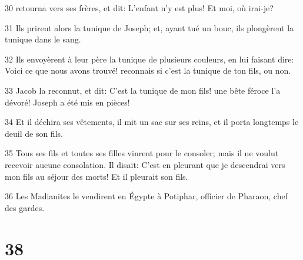 \par 30 retourna vers ses frères, et dit: L'enfant n'y est plus! Et moi, où irai-je?
\par 31 Ils prirent alors la tunique de Joseph; et, ayant tué un bouc, ils plongèrent la tunique dans le sang.
\par 32 Ils envoyèrent à leur père la tunique de plusieurs couleurs, en lui faisant dire: Voici ce que nous avons trouvé! reconnais si c'est la tunique de ton fils, ou non.
\par 33 Jacob la reconnut, et dit: C'est la tunique de mon fils! une bête féroce l'a dévoré! Joseph a été mis en pièces!
\par 34 Et il déchira ses vêtements, il mit un sac sur ses reins, et il porta longtemps le deuil de son fils.
\par 35 Tous ses fils et toutes ses filles vinrent pour le consoler; mais il ne voulut recevoir aucune consolation. Il disait: C'est en pleurant que je descendrai vers mon fils au séjour des morts! Et il pleurait son fils.
\par 36 Les Madianites le vendirent en Égypte à Potiphar, officier de Pharaon, chef des gardes.

\chapter{38}

